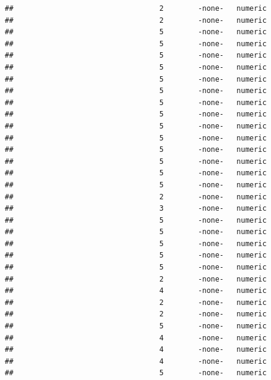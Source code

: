 \documentclass[
  12pt,
]{article}
\begin{document}
\begin{verbatim}
##                                  2        -none-   numeric                    
##                                  2        -none-   numeric                    
##                                  5        -none-   numeric                    
##                                  5        -none-   numeric                    
##                                  5        -none-   numeric                    
##                                  5        -none-   numeric                    
##                                  5        -none-   numeric                    
##                                  5        -none-   numeric                    
##                                  5        -none-   numeric                    
##                                  5        -none-   numeric                    
##                                  5        -none-   numeric                    
##                                  5        -none-   numeric                    
##                                  5        -none-   numeric                    
##                                  5        -none-   numeric                    
##                                  5        -none-   numeric                    
##                                  5        -none-   numeric                    
##                                  2        -none-   numeric                    
##                                  3        -none-   numeric                    
##                                  5        -none-   numeric                    
##                                  5        -none-   numeric                    
##                                  5        -none-   numeric                    
##                                  5        -none-   numeric                    
##                                  5        -none-   numeric                    
##                                  2        -none-   numeric                    
##                                  4        -none-   numeric                    
##                                  2        -none-   numeric                    
##                                  2        -none-   numeric                    
##                                  5        -none-   numeric                    
##                                  4        -none-   numeric                    
##                                  4        -none-   numeric                    
##                                  4        -none-   numeric                    
##                                  5        -none-   numeric                    

\end{verbatim}
\end{document}
